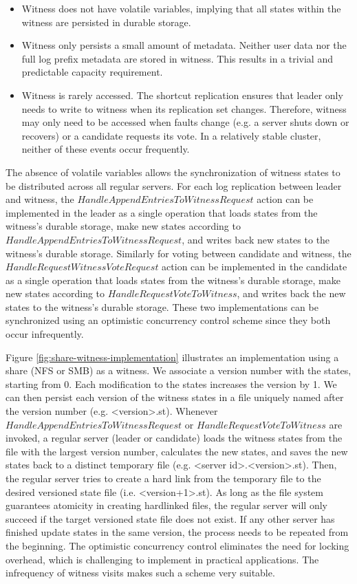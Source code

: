 \begin{itemize} 
    \item Witness does not have volatile variables, implying that all states within the witness are persisted in durable storage. 
    \item Witness only persists a small amount of metadata. Neither user data nor the full log prefix metadata are stored in witness. This results in a trivial and predictable capacity requirement. 
    \item Witness is rarely accessed. The shortcut replication ensures that leader only needs to write to witness when its replication set changes. Therefore, witness may only need to be accessed when faults change (e.g. a server shuts down or recovers) or a candidate requests its vote. In a relatively stable cluster, neither of these events occur frequently. 
\end{itemize}

The absence of volatile variables allows the synchronization of witness states to be distributed across all regular servers. For each log replication between leader and witness, the $HandleAppendEntriesToWitnessRequest$ action can be implemented in the leader as a single operation that loads states from the witness's durable storage, make new states according to $HandleAppendEntriesToWitnessRequest$, and writes back new states to the witness's durable storage. Similarly for voting between candidate and witness, the $HandleRequestWitnessVoteRequest$ action can be implemented in the candidate as a single operation that loads states from the witness's durable storage, make new states according to $HandleRequestVoteToWitness$, and writes back the new states to the witness's durable storage. These two implementations can be synchronized using an optimistic concurrency control scheme since they both occur infrequently.

Figure \ref{fig:share-witness-implementation} illustrates an implementation using a share (NFS or SMB) as a witness. We associate a version number with the states, starting from 0. Each modification to the states increases the version by 1. We can then persist each version of the witness states in a file uniquely named after the version number (e.g. \textless{}version\textgreater{}.st). Whenever $HandleAppendEntriesToWitnessRequest$ or $HandleRequestVoteToWitness$ are invoked, a regular server (leader or candidate) loads the witness states from the file with the largest version number, calculates the new states, and saves the new states back to a distinct temporary file (e.g. \textless{}server id\textgreater{}.\textless{}version\textgreater{}.st). Then, the regular server tries to create a hard link from the temporary file to the desired versioned state file (i.e. \textless{}version+1\textgreater{}.st). As long as the file system guarantees atomicity in creating hardlinked files, the regular server will only succeed if the target versioned state file does not exist. If any other server has finished update states in the same version, the process needs to be repeated from the beginning. The optimistic concurrency control eliminates the need for locking overhead, which is challenging to implement in practical applications. The infrequency of witness visits makes such a scheme very suitable.

